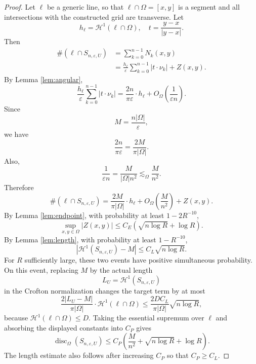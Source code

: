 \documentclass[10pt,a4paper]{amsart}
\newcommand{\cH}{\mathcal H}
\newcommand{\eps}{\varepsilon}
\begin{document}
\begin{proof}
Let $\ell$ be a generic line, so that $\ell\cap\Omega=[x,y]$ is a segment and all intersections with the constructed grid are transverse. Let
\[
        h_\ell=\cH^1(\ell\cap\Omega),
        \quad
        t=\frac{y-x}{|y-x|}.
\]
Then
\[
\begin{aligned}
        \#\left(\ell \cap {S_{n,\eps,U}}\right)
        &=
        \sum_{k=0}^{n-1}N_k(x,y)  \\
        &=
        \frac{h_\ell}{\eps}
        \sum_{k=0}^{n-1}|t\cdot\nu_k|
        +
        Z(x,y).
\end{aligned}
\]
By Lemma \ref{lem:angular},
\[
        \frac{h_\ell}{\eps}
        \sum_{k=0}^{n-1}|t\cdot\nu_k|
        =
        \frac{2n}{\pi\eps}\cdot h_\ell
        +
        O_\Omega\left(\frac1{\eps n}\right).
\]
Since
\[
        M=\frac{n|\Omega|}{\eps},
\]
we have
\[
        \frac{2n}{\pi\eps}
        =
        \frac{2M}{\pi|\Omega|}.
\]
Also,
\[
        \frac1{\eps n}
        =
        \frac{M}{|\Omega|n^2}
        \lesssim_\Omega \frac{M}{n^2}.
\]
Therefore
\[
          \#\left(\ell \cap {S_{n,\eps,U}}\right)
        =
        \frac{2M}{\pi|\Omega|}\cdot h_\ell
        +
        O_\Omega\left(\frac{M}{n^2}\right)
        +
        Z(x,y).
\]
By Lemma \ref{lem:endpoint}, with probability at least $1-2R^{-10}$,
\[
        \sup_{x,y\in\Omega}|Z(x,y)|
        \le
        C_E
        \left(
        \sqrt{n\log R}+\log R
        \right).
\]
By Lemma \ref{lem:length}, with probability at least $1-R^{-10}$,
\[
        \left|
        \cH^1(S_{n,\eps,U})-M
        \right|
        \le
        C_L\sqrt{n\log R}.
\]
For $R$ sufficiently large, these two events have positive simultaneous probability. On this event, replacing $M$ by the actual length
\[
        L_U=\cH^1(S_{n,\eps,U})
\]
in the Crofton normalization changes the target term by at most
\[
        \frac{2|L_U-M|}{\pi|\Omega|}\cdot
        \cH^1(\ell\cap\Omega)
        \le
        \frac{2DC_L}{\pi|\Omega|}\sqrt{n\log R},
\]
because $\cH^1(\ell\cap\Omega)\le D$. Taking the essential supremum over $\ell$ and absorbing the displayed constants into $C_P$ gives
\[
        \operatorname{disc}_\Omega(S_{n,\eps,U})
        \le
        C_P
        \left(
        \frac{M}{n^2}
        +
        \sqrt{n\log R}
        +
        \log R
        \right).
\]
The length estimate also follows after increasing $C_P$ so that $C_P\ge C_L$.
\end{proof}
\end{document}
